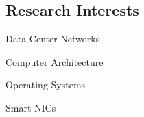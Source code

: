 \documentclass[../main.tex]{subfiles}
\begin{document}
\begin{category}
\section{Research Interests}
    \begin{enumerate*}[label=$\diamond$]
        \item Data Center Networks \qquad \qquad 
        \item Computer Architecture \qquad \qquad
        \item Operating Systems \qquad \qquad 
        \item Smart-NICs
    \end{enumerate*}
\end{category}
\end{document}
